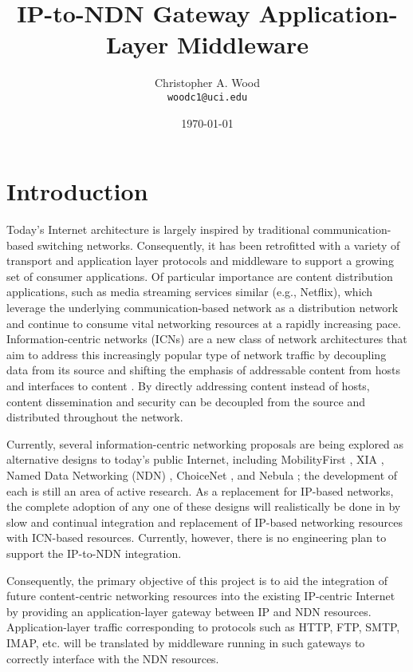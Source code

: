 \documentclass[10pt]{article}
\begin{document}
\title{IP-to-NDN Gateway Application-Layer Middleware}
\author{Christopher A. Wood \\ {\tt woodc1@uci.edu}}
\date{\today}
\maketitle


\section{Introduction}
Today's Internet architecture is largely inspired by traditional communication-based switching networks. Consequently, it has been retrofitted with a variety of transport and application layer protocols and middleware to support a growing set of consumer applications. Of particular importance are content distribution applications, such as media streaming services similar (e.g., Netflix), which leverage the underlying communication-based network as a distribution network and continue to consume vital networking resources at a rapidly increasing pace. Information-centric networks (ICNs) are a new class of network architectures that aim to address this increasingly popular type of network traffic by decoupling data from its source and shifting the emphasis of addressable content from hosts and interfaces to content \cite{}. By directly addressing content instead of hosts, content dissemination and security can be decoupled from the source and distributed throughout the network. 

Currently, several information-centric networking proposals are being explored as alternative designs to today's public Internet, including MobilityFirst \cite{}, XIA \cite{}, Named Data Networking (NDN) \cite{NDNtech}, ChoiceNet \cite{}, and Nebula \cite{}; the development of each is still an area of active research. As a replacement for IP-based networks, the complete adoption of any one of these designs will realistically be done in by slow and continual integration and replacement of IP-based networking resources with ICN-based resources. Currently, however, there is no engineering plan to support the IP-to-NDN integration. 

Consequently, the primary objective of this project is to aid the integration of future content-centric networking resources into the existing IP-centric Internet by providing an application-layer gateway between IP and NDN resources. Application-layer traffic corresponding to protocols such as HTTP, FTP, SMTP, IMAP, etc. will be translated by middleware running in such gateways to correctly interface with the NDN resources. 
\end{document}
